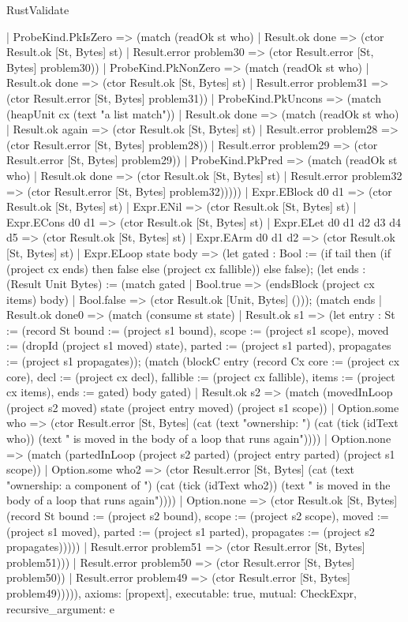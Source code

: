 \begin{lexlean}{RustValidate}
\begin{semanticmodule}
{        | ProbeKind.PkIsZero => (match (readOk st who)
          | Result.ok done => (ctor Result.ok [St, Bytes] st)
          | Result.error problem30 => (ctor Result.error [St, Bytes] problem30))
        | ProbeKind.PkNonZero => (match (readOk st who)
          | Result.ok done => (ctor Result.ok [St, Bytes] st)
          | Result.error problem31 => (ctor Result.error [St, Bytes] problem31))
        | ProbeKind.PkUncons => (match (heapUnit cx (text "a list match"))
          | Result.ok done => (match (readOk st who)
            | Result.ok again => (ctor Result.ok [St, Bytes] st)
            | Result.error problem28 => (ctor Result.error [St, Bytes] problem28))
          | Result.error problem29 => (ctor Result.error [St, Bytes] problem29))
        | ProbeKind.PkPred => (match (readOk st who)
          | Result.ok done => (ctor Result.ok [St, Bytes] st)
          | Result.error problem32 => (ctor Result.error [St, Bytes] problem32)))))
    | Expr.EBlock d0 d1 => (ctor Result.ok [St, Bytes] st)
    | Expr.ENil => (ctor Result.ok [St, Bytes] st)
    | Expr.ECons d0 d1 => (ctor Result.ok [St, Bytes] st)
    | Expr.ELet d0 d1 d2 d3 d4 d5 => (ctor Result.ok [St, Bytes] st)
    | Expr.EArm d0 d1 d2 => (ctor Result.ok [St, Bytes] st)
    | Expr.ELoop state body => (let gated : Bool := (if tail then (if (project cx ends) then false else (project cx fallible)) else false); (let ends : (Result Unit Bytes) := (match gated
      | Bool.true => (endsBlock (project cx items) body)
      | Bool.false => (ctor Result.ok [Unit, Bytes] ())); (match ends
      | Result.ok done0 => (match (consume st state)
        | Result.ok s1 => (let entry : St := (record St {bound := (project s1 bound), scope := (project s1 scope), moved := (dropId (project s1 moved) state), parted := (project s1 parted), propagates := (project s1 propagates)}); (match (blockC entry (record Cx {core := (project cx core), decl := (project cx decl), fallible := (project cx fallible), items := (project cx items), ends := gated}) body gated)
          | Result.ok s2 => (match (movedInLoop (project s2 moved) state (project entry moved) (project s1 scope))
            | Option.some who => (ctor Result.error [St, Bytes] (cat (text "ownership: ") (cat (tick (idText who)) (text " is moved in the body of a loop that runs again"))))
            | Option.none => (match (partedInLoop (project s2 parted) (project entry parted) (project s1 scope))
              | Option.some who2 => (ctor Result.error [St, Bytes] (cat (text "ownership: a component of ") (cat (tick (idText who2)) (text " is moved in the body of a loop that runs again"))))
              | Option.none => (ctor Result.ok [St, Bytes] (record St {bound := (project s2 bound), scope := (project s2 scope), moved := (project s1 moved), parted := (project s1 parted), propagates := (project s2 propagates)}))))
          | Result.error problem51 => (ctor Result.error [St, Bytes] problem51)))
        | Result.error problem50 => (ctor Result.error [St, Bytes] problem50))
      | Result.error problem49 => (ctor Result.error [St, Bytes] problem49))))),
  axioms: [propext],
  executable: true,
  mutual: CheckExpr,
  recursive_argument: e
}


\end{semanticmodule}
\end{lexlean}
